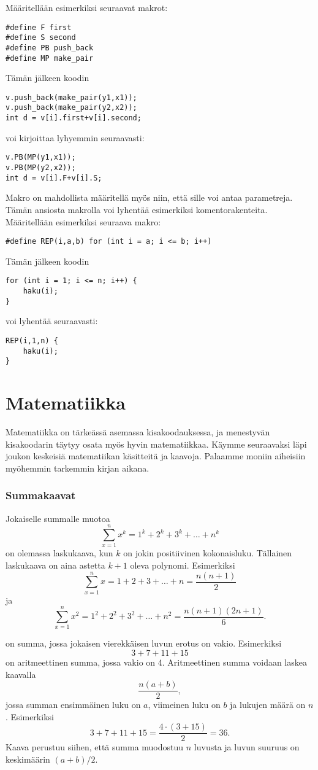 Määritellään esimerkiksi seuraavat makrot:
\begin{lstlisting}
#define F first
#define S second
#define PB push_back
#define MP make_pair
\end{lstlisting}
Tämän jälkeen koodin
\begin{lstlisting}
v.push_back(make_pair(y1,x1));
v.push_back(make_pair(y2,x2));
int d = v[i].first+v[i].second;
\end{lstlisting}
voi kirjoittaa lyhyemmin seuraavasti:
\begin{lstlisting}
v.PB(MP(y1,x1));
v.PB(MP(y2,x2));
int d = v[i].F+v[i].S;
\end{lstlisting}

Makro on mahdollista määritellä myös niin,
että sille voi antaa parametreja.
Tämän ansiosta makrolla voi lyhentää esimerkiksi
komentorakenteita.
Määritellään esimerkiksi seuraava makro:
\begin{lstlisting}
#define REP(i,a,b) for (int i = a; i <= b; i++)
\end{lstlisting}
Tämän jälkeen koodin
\begin{lstlisting}
for (int i = 1; i <= n; i++) {
    haku(i);
}
\end{lstlisting}
voi lyhentää seuraavasti:
\begin{lstlisting}
REP(i,1,n) {
    haku(i);
}
\end{lstlisting}

\section{Matematiikka}

Matematiikka on tärkeässä asemassa kisakoodauksessa,
ja menestyvän kisakoodarin täytyy osata myös
hyvin matematiikkaa.
Käymme seuraavaksi läpi joukon keskeisiä
matematiikan käsitteitä ja kaavoja.
Palaamme moniin aiheisiin myöhemmin tarkemmin kirjan aikana.

\subsubsection{Summakaavat}

Jokaiselle summalle muotoa
\[\sum_{x=1}^n x^k = 1^k+2^k+3^k+\ldots+n^k\]
on olemassa laskukaava,
kun $k$ on jokin positiivinen kokonaisluku.
Tällainen laskukaava on aina astetta $k+1$
oleva polynomi. Esimerkiksi
\[\sum_{x=1}^n x = 1+2+3+\ldots+n = \frac{n(n+1)}{2}\]
ja
\[\sum_{x=1}^n x^2 = 1^2+2^2+3^2+\ldots+n^2 = \frac{n(n+1)(2n+1)}{6}.\]

 on summa, 
jossa jokaisen vierekkäisen luvun erotus on vakio.
Esimerkiksi
\[3+7+11+15\]
on aritmeettinen summa,
jossa vakio on 4.
Aritmeettinen summa voidaan laskea kaavalla
\[\frac{n(a+b)}{2},\]
jossa summan ensimmäinen luku on $a$,
viimeinen luku on $b$ ja lukujen määrä on $n$.
Esimerkiksi
\[3+7+11+15=\frac{4 \cdot (3+15)}{2} = 36.\]
Kaava perustuu siihen, että summa muodostuu $n$ luvusta
ja luvun suuruus on keskimäärin $(a+b)/2$.


